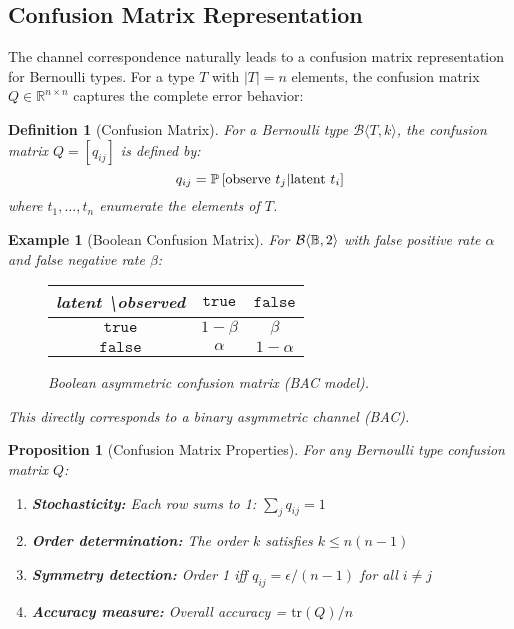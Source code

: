 \documentclass[11pt,final,hidelinks]{article}
\newtheorem{proposition}[theorem]{Proposition}
\newtheorem{definition}[theorem]{Definition}
\newtheorem{example}[theorem]{Example}
\newcommand{\bernoulli}[2]{\mathcal{B}\langle #1, #2 \rangle}
\begin{document}
\subsection{Confusion Matrix Representation}

The channel correspondence naturally leads to a confusion matrix representation for Bernoulli types. For a type $T$ with $|T| = n$ elements, the confusion matrix $Q \in \mathbb{R}^{n \times n}$ captures the complete error behavior:

\begin{definition}[Confusion Matrix]
For a Bernoulli type $\bernoulli{T}{k}$, the confusion matrix $Q = [q_{ij}]$ is defined by:
\begin{equation}
q_{ij} = \mathbb{P}\left[\text{observe } t_j | \text{latent } t_i\right]
\end{equation}
where $t_1, \ldots, t_n$ enumerate the elements of $T$.
\end{definition}

\begin{example}[Boolean Confusion Matrix]
For $\bernoulli{\Bool}{2}$ with false positive rate $\alpha$ and false negative rate $\beta$:
\begin{figure}[t]
\centering
\begin{tabular}{c|cc}
latent \textbackslash observed & $\mathtt{true}$ & $\mathtt{false}$ \\
\hline
$\mathtt{true}$ & $1-\beta$ & $\beta$ \\
$\mathtt{false}$ & $\alpha$ & $1-\alpha$
\end{tabular}
\caption{Boolean asymmetric confusion matrix (BAC model).}
\end{figure}
This directly corresponds to a binary asymmetric channel (BAC).
\end{example}

\begin{proposition}[Confusion Matrix Properties]
For any Bernoulli type confusion matrix $Q$:
\begin{enumerate}
    \item \textbf{Stochasticity:} Each row sums to 1: $\sum_j q_{ij} = 1$
    \item \textbf{Order determination:} The order $k$ satisfies $k \leq n(n-1)$
    \item \textbf{Symmetry detection:} Order 1 iff $q_{ij} = \epsilon/(n-1)$ for all $i \neq j$
    \item \textbf{Accuracy measure:} Overall accuracy = $\text{tr}(Q)/n$
\end{enumerate}
\end{proposition}
\end{document}
